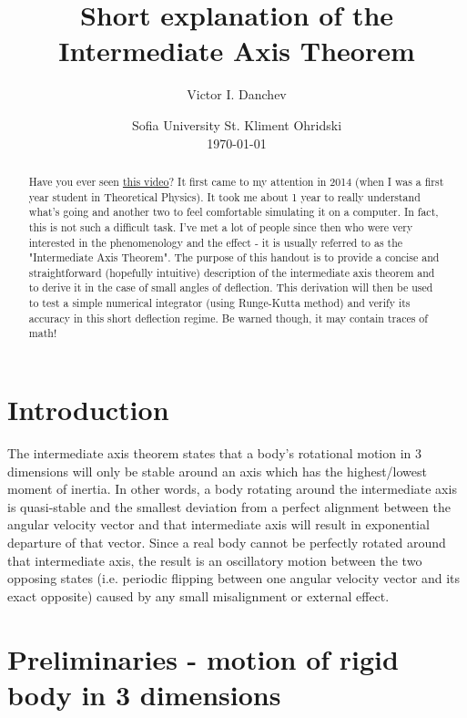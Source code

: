 \documentclass[a4paper]{article}
\title{Short explanation of the Intermediate Axis Theorem}
\author{Victor I.  Danchev}
\date{
	Sofia University St.  Kliment Ohridski \\ 
	\today
}
\begin{document}
	\maketitle
	
	\begin{abstract}
	
	Have you ever seen \href{https://www.youtube.com/watch?v=1n-HMSCDYtM}{this video}?
	It first came to my attention in 2014 (when I was a first year student in Theoretical Physics).
	It took me about 1 year to really understand what's going and another two to feel comfortable simulating it on a computer.
	In fact,  this is not such a difficult task.
	I've met a lot of people since then who were very interested in the phenomenology and the effect - it is usually referred to as the "Intermediate Axis Theorem". 
	The purpose of this handout is to provide a concise and straightforward (hopefully intuitive) description of the intermediate axis theorem and to derive it in the case of small angles of deflection. 
	This derivation will then be used to test a simple numerical integrator (using Runge-Kutta method) and verify its accuracy in this short deflection regime.
	Be warned though,  it may contain traces of math!
	\end{abstract}

	\tableofcontents

	\newpage
	
	\section{Introduction} \label{Intro}
	
	The intermediate axis theorem states that a body's rotational motion in 3 dimensions will only be stable around an axis which has the highest/lowest moment of inertia.
	In other words,  a body rotating around the intermediate axis is quasi-stable and the smallest deviation from a perfect alignment between the angular velocity vector and that intermediate axis will result in exponential departure of that vector.
	Since a real body cannot be perfectly rotated around that intermediate axis, the result is an oscillatory motion between the two opposing states (i.e. periodic flipping between one angular velocity vector and its exact opposite) caused by any small misalignment or external effect.	
	
	\section{Preliminaries - motion of rigid body in 3 dimensions}\label{rigid_body_dynamics}
\end{document}
